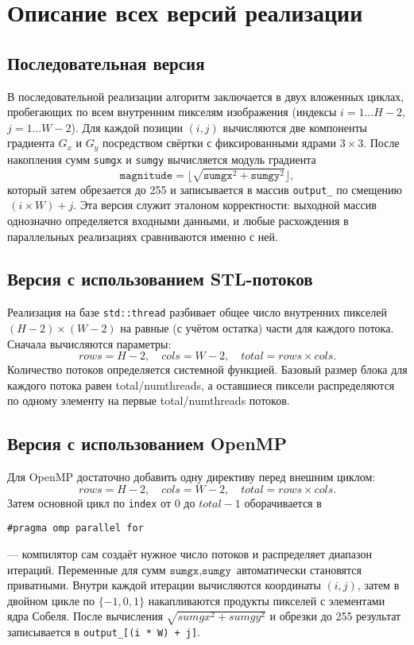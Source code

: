 \documentclass[12pt]{article}
\begin{document}
\section{Описание всех версий реализации}

\subsection{Последовательная версия}

В последовательной реализации алгоритм заключается в двух вложенных циклах, пробегающих по всем внутренним пикселям изображения (индексы $i=1\ldots H-2$, $j=1\ldots W-2$). Для каждой позиции $(i,j)$ вычисляются две компоненты градиента $G_x$ и $G_y$ посредством свёртки с фиксированными ядрами $3\times3$. После накопления сумм \texttt{sumgx} и \texttt{sumgy} вычисляется модуль градиента
\[
    \texttt{magnitude} = \lfloor \sqrt{\texttt{sumgx}^2 + \texttt{sumgy}^2} \rfloor,
\]
который затем обрезается до 255 и записывается в массив \texttt{output\_} по смещению \(\,(i \times W) + j\). Эта версия служит эталоном корректности: выходной массив однозначно определяется входными данными, и любые расхождения в параллельных реализациях сравниваются именно с ней.

\subsection{Версия с использованием STL-потоков}

Реализация на базе \texttt{std::thread} разбивает общее число внутренних пикселей \((H-2)\times(W-2)\) на равные (с учётом остатка) части для каждого потока. Сначала вычисляются параметры:
\[
    rows = H - 2,\quad cols = W - 2,\quad total = rows \times cols.
\]
Количество потоков определяется системной функцией.
Базовый размер блока для каждого потока равен total/numthreads,
а оставшиеся пиксели распределяются по одному элементу 
на первые total/numthreads потоков.

\subsection{Версия с использованием OpenMP}

Для OpenMP достаточно добавить одну директиву перед внешним циклом:
\[
rows = H - 2,\quad cols = W - 2,\quad total = rows \times cols.
\]
Затем основной цикл по \texttt{index} от \(0\) до \(total - 1\) оборачивается в
\begin{verbatim}
#pragma omp parallel for
\end{verbatim}
— компилятор сам создаёт нужное число потоков и распределяет диапазон итераций. Переменные для сумм \(\texttt{sumgx}, \texttt{sumgy}\) автоматически становятся приватными. Внутри каждой итерации вычисляются координаты \((i,j)\), затем в двойном цикле по \(\{-1,0,1\}\) накапливаются продукты пикселей с элементами ядра Собеля. После вычисления \(\sqrt{sumgx^2 + sumgy^2}\) и обрезки до 255 результат записывается в \texttt{output\_[(i * W) + j]}.
\end{document}
